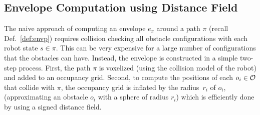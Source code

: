 \documentclass[a4paper]{report}
\begin{document}
\subsection{Envelope Computation using Distance Field}
\label{sec:impl_details}
The naive approach of computing an envelope $e_\pi$ around a path $\pi$ (recall Def.~\ref{def:envp}) requires collision checking all obstacle configurations with each robot state $s \in \pi$. This can be very expensive for a large number of configurations that the obstacles can have.
%
%
%
%
%
%
Instead, the envelope is constructed in a simple two-step process.
First, the path $\pi$ is voxelized (using the collision model of the robot) and added to an occupancy grid.
Second, 
to compute the positions of each $o_i \in \mathcal{O}$ that collide with $\pi$, the occupancy grid is inflated by the radius~$r_i$ of $o_i$, (approximating an obstacle $o_i$ with a sphere of radius $r_i$) which is efficiently done by using a signed distance field.
\end{document}
